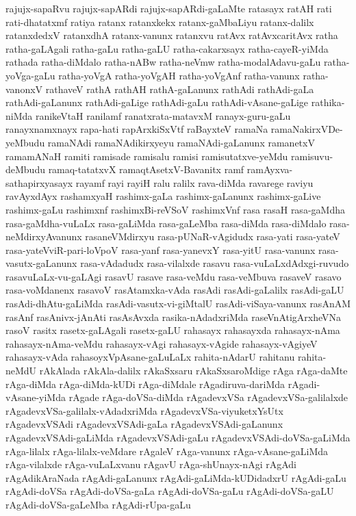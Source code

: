 {rajujx-sapaRvu
rajujx-sapARdi
rajujx-sapARdi-gaLaMte
ratasayx
ratAH
rati
rati-dhatatxmf
ratiya
ratanx
ratanxkekx
ratanx-gaMbaLiyu
ratanx-dalilx
ratanxdedxV
ratanxdhA
ratanx-vanunx
ratanxvu
ratAvx
ratAvxcaritAvx
ratha
ratha-gaLAgali
ratha-gaLu
ratha-gaLU
ratha-cakarxsayx
ratha-cayeR-yiMda
rathada
ratha-diMdalo
ratha-nABw
ratha-neVmw
ratha-modalAdavu-gaLu
ratha-yoVga-gaLu
ratha-yoVgA
ratha-yoVgAH
ratha-yoVgAnf
ratha-vanunx
ratha-vanonxV
rathaveV
rathA
rathAH
rathA-gaLanunx
rathAdi
rathAdi-gaLa
rathAdi-gaLanunx
rathAdi-gaLige
rathAdi-gaLu
rathAdi-vAsane-gaLige
rathika-niMda
ranikeVtaH
ranilamf
ranatxrata-matavxM
ranayx-guru-gaLu
ranayxnamxnayx
rapa-hati
rapArxkiSxVtf
raBayxteV
ramaNa
ramaNakirxVDe-yeMbudu
ramaNAdi
ramaNAdikirxyeyu
ramaNAdi-gaLanunx
ramanetxV
ramamANaH
ramiti
ramisade
ramisalu
ramisi
ramisutatxve-yeMdu
ramisuvu-deMbudu
ramaq-tatatxvX
ramaqtAsetxV-Bavanitx
ramf
ramAyxva-sathapirxyasayx
rayamf
rayi
rayiH
ralu
ralilx
rava-diMda
ravarege
raviyu
ravAyxdAyx
rashamxyaH
rashimx-gaLa
rashimx-gaLanunx
rashimx-gaLive
rashimx-gaLu
rashimxnf
rashimxBi-reVSoV
rashimxVnf
rasa
rasaH
rasa-gaMdha
rasa-gaMdha-vuLaLx
rasa-gaLiMda
rasa-gaLeMba
rasa-diMda
rasa-diMdalo
rasa-neMdirxyAvanunx
rasaneVMdirxyu
rasa-pUNaR-vAgidudx
rasa-yati
rasa-yateV
rasa-yateVviR-pari-loVpoV
rasa-yanf
rasa-yanevxY
rasa-yitU
rasa-vanunx
rasa-vasutx-gaLanunx
rasa-vAdadudx
rasa-vilalxde
rasavu
rasa-vuLaLxdAdxgi-ruvudo
rasavuLaLx-vu-gaLAgi
rasavU
rasave
rasa-veMdu
rasa-veMbuva
rasaveV
rasavo
rasa-voMdanenx
rasavoV
rasAtamxka-vAda
rasAdi
rasAdi-gaLalilx
rasAdi-gaLU
rasAdi-dhAtu-gaLiMda
rasAdi-vasutx-vi-giMtalU
rasAdi-viSaya-vanunx
rasAnAM
rasAnf
rasAnivx-jAnAti
rasAsAvxda
rasika-nAdadxriMda
raseVnAtigArxheVNa
rasoV
rasitx
rasetx-gaLAgali
rasetx-gaLU
rahasayx
rahasayxda
rahasayx-nAma
rahasayx-nAma-veMdu
rahasayx-vAgi
rahasayx-vAgide
rahasayx-vAgiyeV
rahasayx-vAda
rahasoyxVpAsane-gaLuLaLx
rahita-nAdarU
rahitanu
rahita-neMdU
rAkAlada
rAkAla-dalilx
rAkaSxsaru
rAkaSxsaroMdige
rAga
rAga-daMte
rAga-diMda
rAga-diMda-kUDi
rAga-diMdale
rAgadiruva-dariMda
rAgadi-vAsane-yiMda
rAgade
rAga-doVSa-diMda
rAgadevxVSa
rAgadevxVSa-galilalxde
rAgadevxVSa-galilalx-vAdadxriMda
rAgadevxVSa-viyuketxYsUtx
rAgadevxVSAdi
rAgadevxVSAdi-gaLa
rAgadevxVSAdi-gaLanunx
rAgadevxVSAdi-gaLiMda
rAgadevxVSAdi-gaLu
rAgadevxVSAdi-doVSa-gaLiMda
rAga-lilalx
rAga-lilalx-veMdare
rAgaleV
rAga-vanunx
rAga-vAsane-gaLiMda
rAga-vilalxde
rAga-vuLaLxvanu
rAgavU
rAga-shUnayx-nAgi
rAgAdi
rAgAdikAraNada
rAgAdi-gaLanunx
rAgAdi-gaLiMda-kUDidadxrU
rAgAdi-gaLu
rAgAdi-doVSa
rAgAdi-doVSa-gaLa
rAgAdi-doVSa-gaLu
rAgAdi-doVSa-gaLU
rAgAdi-doVSa-gaLeMba
rAgAdi-rUpa-gaLu
}

